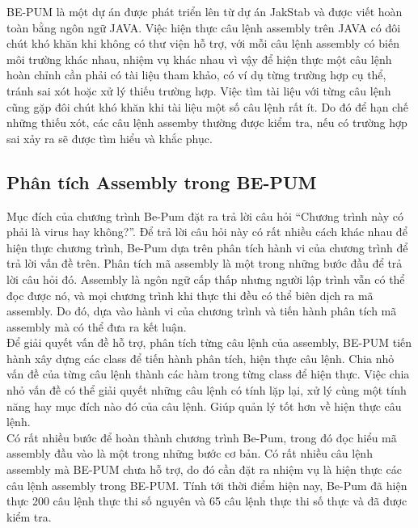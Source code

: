 BE-PUM là một dự án được phát triển lên từ dự án JakStab và được viết hoàn toàn bằng ngôn ngữ JAVA. Việc hiện thực câu lệnh assembly trên JAVA có đôi chút khó khăn khi không có thư viện hỗ trợ, với mỗi câu lệnh assembly có biến môi trường khác nhau, nhiệm vụ khác nhau vì vậy để hiện thực một câu lệnh hoàn chỉnh cần phải có tài liệu tham khảo, có ví dụ từng trường hợp cụ thể, tránh sai xót hoặc xử lý thiếu trường hợp. Việc tìm tài liệu với từng câu lệnh cũng gặp đôi chút khó khăn khi tài liệu một số câu lệnh rất ít. Do đó để hạn chế những thiếu xót, các câu lệnh assemby thường được kiểm tra, nếu có trường hợp sai xảy ra sẽ được tìm hiểu và khắc phục.\\

  \subsection{Phân tích Assembly trong BE-PUM}
  Mục đích của chương trình Be-Pum đặt ra trả lời câu hỏi “Chương trình này có phải là virus hay không?”. Để trả lời câu hỏi này có rất nhiều cách khác nhau để hiện thực chương trình, Be-Pum dựa trên phân tích hành vi của chương trình để trả lời vấn đề trên. Phân tích mã assembly là một trong những bước đầu để trả lời câu hỏi đó. Assembly là ngôn ngữ cấp thấp nhưng người lập trình vẫn có thể đọc được nó, và mọi chương trình khi thực thi đều có thể biên dịch ra mã assembly. Do đó, dựa vào hành vi của chương trình và tiến hành phân tích mã assembly mà có thể đưa ra kết luận.\\

Để giải quyết vấn đề hỗ trợ, phân tích từng câu lệnh của assembly, BE-PUM tiến hành xây dựng các class để tiến hành phân tích, hiện thực câu lệnh. Chia nhỏ vấn đề của từng câu lệnh thành các hàm trong từng class để hiện thực. Việc chia nhỏ vấn đề có thể giải quyết những câu lệnh có tính lặp lại, xử lý cùng một tính năng hay mục đích nào đó của câu lệnh. Giúp quản lý tốt hơn về hiện thực câu lệnh.\\

Có rất nhiều bước để hoàn thành chương trình Be-Pum, trong đó đọc hiểu mã assembly đầu vào là một trong những bước cơ bản. Có rất nhiều câu lệnh assembly mà BE-PUM chưa hỗ trợ, do đó cần đặt ra nhiệm vụ là hiện thực các câu lệnh assembly trong BE-PUM. Tính tới thời điểm hiện nay, Be-Pum đã hiện thực 200 câu lệnh thực thi số nguyên và 65 câu lệnh thực thi số thực và đã được kiểm tra. \\ 


